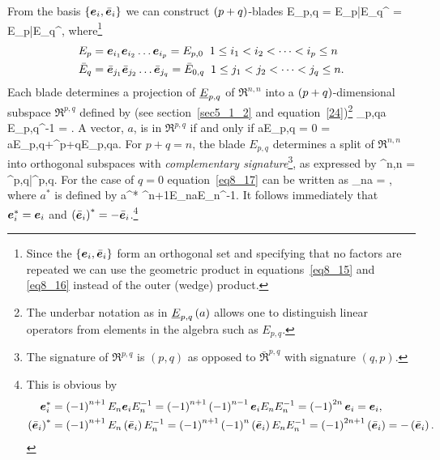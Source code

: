 From the basis $\left \{ {\bm{e}_{i},\bar{\bm{e}}_{i}} \right \}$ we can construct $\left ( {p+q} \right )$-blades
\be\label{eq8_14}
	E_{p,q} = E_{p}\W\bar{E}_{q}^{\R} = E_{p}\bar{E}_{q}^{\R},
\ee 
where\footnote{Since the $\left \{ {\bm{e}_{i},\bar{\bm{e}}_{i}} \right \}$ form an orthogonal set and specifying that no factors are repeated 
we can use the geometric product in 
equations~\ref{eq8_15} and \ref{eq8_16} instead of the outer (wedge) product.}
\begin{align}
	E_{p} &= \eb_{i_{1}}\eb_{i_{2}}\dots\eb_{i_{p}} = E_{p,0}\;\; 1\le i_{1}< i_{2}<\dots < i_{p}\le n \label{eq8_15}\\
	\bar{E}_{q} &= \ebb_{j_{1}}\ebb_{j_{2}}\dots\ebb_{j_{q}} = \bar{E}_{0,q}\;\; 1\le j_{1}< j_{2}
	              <\dots < j_{q}\le n.\label{eq8_16}
\end{align}
Each blade determines a projection of $\underline{E}_{p,q}$ of $\Re^{n,n}$ into a $\left ( {p+q} \right )$-dimensional subspace
$\Re^{p,q}$ defined by (see section~\ref{sec5_1_2} and equation~\ref{24})\footnote{The underbar notation as in 
${\underline{E}_{p,q}}\left ( {a} \right )$ allows one to distinguish linear operators from elements in the algebra such as $E_{p,q}$.}
\be\label{eq8_17}
	_{p,q}a \equiv {}E_{p,q}^{-1} = \half{}. 
\ee
A vector, $a$, is in $\Re^{p,q}$ if and only if 
\be
	a\W E_{p,q} = 0 = aE_{p,q}+^{p+q}E_{p,q}a.
\ee
For $p+q=n$, the blade $E_{p,q}$ determines a split of $\Re^{n,n}$ into orthogonal subspaces with {\em complementary 
signature}\footnote{The signature of $\Re^{p,q}$ is $(p,q)$ as opposed to $\bar{\Re}^{p,q}$ with signature $(q,p)$.}, 
as expressed by
\be
	\Re^{n,n} = \Re^{p,q}\oplus\bar{\Re}^{p,q}.
\ee  
For the case of $q=0$ equation~\ref{eq8_17} can be written as
\be
	_{n}a = \half{},
\ee
where $a^{*}$ is defined by
\be
	a^{*} \equiv {}^{n+1}E_{n}aE_{n}^{-1}.
\ee
It follows immediately that $\bm{e}_{i}^{*} = \bm{e}_{i}$ and $\left ( {\bar{\bm{e}}_{i}} \right )^{*} = -\bar{\bm{e}}_{i}$.\footnote{This is
obvious by
\begin{align*}
	\bm{e}_{i}^{*} &= \left ( {-1} \right )^{n+1}E_{n}\bm{e}_{i}E_{n}^{-1} = \left ( {-1} \right )^{n+1}\left ( {-1} \right )^{n-1}\bm{e}_{i}E_{n}E_{n}^{-1} 
	           = \left ( {-1} \right )^{2n}\bm{e}_{i} = \bm{e}_{i}, \\
	\left ( {\bar{\bm{e}}_{i}} \right )^{*}  &= \left ( {-1} \right )^{n+1}E_{n}\left ( {\bar{\bm{e}}_{i}} \right ) E_{n}^{-1} =
	                             \left ( {-1} \right )^{n+1}\left ( {-1} \right )^{n}\left ( {\bar{\bm{e}}_{i}} \right ) E_{n}E_{n}^{-1} 
	                          = \left ( {-1} \right )^{2n+1}\left ( {\bar{\bm{e}}_{i}} \right ) = -\left ( {\bar{\bm{e}}_{i}} \right ).
\end{align*}
}
